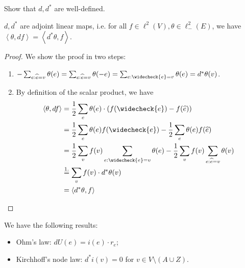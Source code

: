 \begin{exer}[]
    Show that $d,d^*$ are well-defined.
\end{exer}

\begin{lem}[]
    \(d,d^*\) are adjoint linear maps, i.e. for all \(f \in \ell^2(V), \theta \in \ell^2_{-}(E)\), we have \( \left\langle \theta, df \right\rangle = \left\langle d^*\theta, f \right\rangle  \).
\end{lem}

\begin{proof}
    We show the proof in two steps:
    \begin{enumerate}[]
      \item \(- \sum_{e: \widehat{e}=v}\theta(e) = \sum_{e: \widehat{e}=v} \theta(-e) = \sum_{e: \widecheck{e}=v} \theta(e) = d^*\theta(v)\).
      \item By definition of the scalar product, we have
        \begin{align*}
          \left\langle \theta,df \right\rangle &= \frac{1}{2}\sum_e \theta(e) \cdot \left(f( \widecheck{e})- f( \widehat{e}) \right) \\
                                               &=\frac{1}{2}\sum_e \theta(e) f( \widecheck{e}) - \frac{1}{2} \sum_e \theta(e) f( \widehat{e}) \\
                                               &=\frac{1}{2}\sum_v f(v) \sum_{e: \widecheck{e}=v}\theta(e) - \frac{1}{2} \sum_v f(v)\sum_{e: \widehat{e}=v} \theta(v) \\
                                               &\overset{\mathclap{1.}}{=} \sum_v f(v)\cdot d^*\theta(v) \\
                                               &= \left\langle d^*\theta, f \right\rangle 
        \end{align*}
    \end{enumerate}
    
\end{proof}


\begin{remark}[]
    We have the following results:
    \begin{itemize}
      \item Ohm's law:  \(dU(e) = i(e)\cdot r_{e}\);
      \item Kirchhoff's node law: \(d^*i(v) = 0\) for \(v \in V \setminus (A \cup Z)\).
    \end{itemize}
    
\end{remark}

